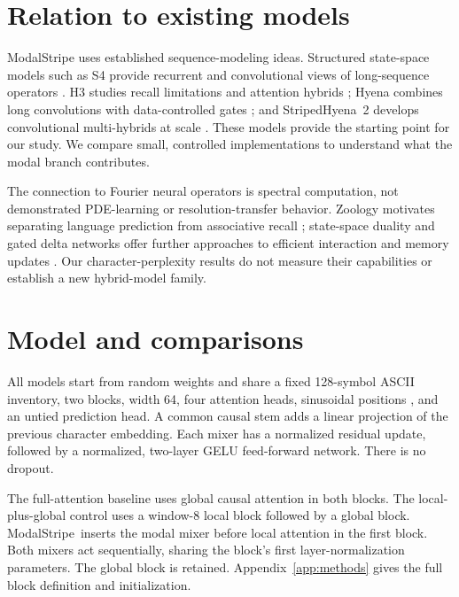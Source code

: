 \documentclass[11pt,letterpaper]{article}
\newcommand{\model}{ModalStripe}
\begin{document}
\section{Relation to existing models}
ModalStripe uses established sequence-modeling ideas. Structured state-space models such as S4 provide recurrent and convolutional views of long-sequence operators \cite{s4}. H3 studies recall limitations and attention hybrids \cite{h3}; Hyena combines long convolutions with data-controlled gates \cite{hyena}; and StripedHyena~2 develops convolutional multi-hybrids at scale \cite{stripedhyena}. These models provide the starting point for our study. We compare small, controlled implementations to understand what the modal branch contributes.

The connection to Fourier neural operators \cite{fno} is spectral computation, not demonstrated PDE-learning or resolution-transfer behavior. Zoology motivates separating language prediction from associative recall \cite{zoology}; state-space duality and gated delta networks offer further approaches to efficient interaction and memory updates \cite{ssd,deltanet}. Our character-perplexity results do not measure their capabilities or establish a new hybrid-model family.

\section{Model and comparisons}
All models start from random weights and share a fixed 128-symbol ASCII inventory, two blocks, width 64, four attention heads, sinusoidal positions \cite{vaswani}, and an untied prediction head. A common causal stem adds a linear projection of the previous character embedding. Each mixer has a normalized residual update, followed by a normalized, two-layer GELU feed-forward network. There is no dropout.

The full-attention baseline uses global causal attention in both blocks. The local-plus-global control uses a window-8 local block followed by a global block. \model\ inserts the modal mixer before local attention in the first block. Both mixers act sequentially, sharing the block's first layer-normalization parameters. The global block is retained. Appendix~\ref{app:methods} gives the full block definition and initialization.
\end{document}
